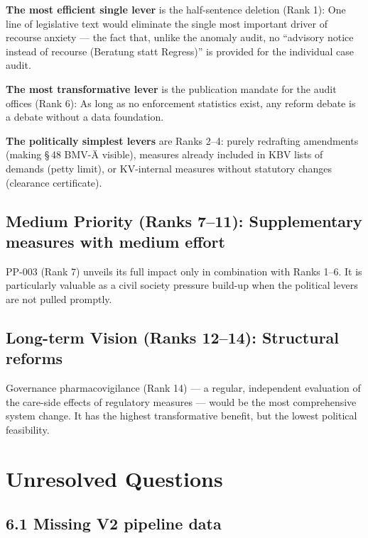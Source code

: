 \documentclass{umbruch-position}
\providecommand{\textgerman}[1]{#1}
\begin{document}
\textbf{The most efficient single lever} is the half-sentence deletion (Rank 1): One line of legislative text would eliminate the single most important driver of recourse anxiety --- the fact that, unlike the anomaly audit, no ``advisory notice instead of recourse (\textgerman{Beratung statt Regress})'' is provided for the individual case audit.

\textbf{The most transformative lever} is the publication mandate for the audit offices (Rank 6): As long as no enforcement statistics exist, any reform debate is a debate without a data foundation.

\textbf{The politically simplest levers} are Ranks 2--4: purely redrafting amendments (making \S\,48 BMV-\"A visible), measures already included in KBV lists of demands (petty limit), or KV-internal measures without statutory changes (clearance certificate).

\subsection*{Medium Priority (Ranks 7--11): Supplementary measures with medium effort}

PP-003 (Rank 7) unveils its full impact only in combination with Ranks 1--6. It is particularly valuable as a civil society pressure build-up when the political levers are not pulled promptly.

\subsection*{Long-term Vision (Ranks 12--14): Structural reforms}

Governance pharmacovigilance (Rank 14) --- a regular, independent evaluation of the care-side effects of regulatory measures --- would be the most comprehensive system change. It has the highest transformative benefit, but the lowest political feasibility.

\section{Unresolved Questions}

\subsection*{6.1 Missing V2 pipeline data}
\end{document}
